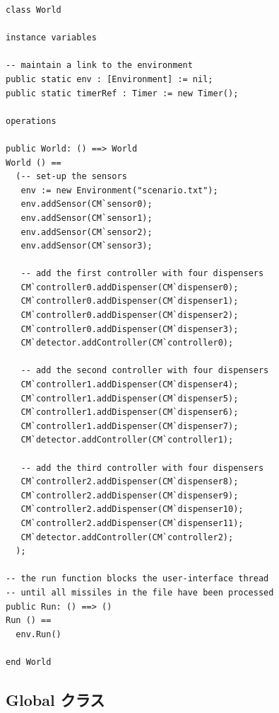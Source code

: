 \documentclass[\pformat,12pt]{jreport}
\begin{document}
\begin{lstlisting}
class World

instance variables
  
-- maintain a link to the environment
public static env : [Environment] := nil;
public static timerRef : Timer := new Timer();

operations

public World: () ==> World
World () ==
  (-- set-up the sensors
   env := new Environment("scenario.txt");
   env.addSensor(CM`sensor0);
   env.addSensor(CM`sensor1);
   env.addSensor(CM`sensor2);
   env.addSensor(CM`sensor3);

   -- add the first controller with four dispensers
   CM`controller0.addDispenser(CM`dispenser0);
   CM`controller0.addDispenser(CM`dispenser1);
   CM`controller0.addDispenser(CM`dispenser2);
   CM`controller0.addDispenser(CM`dispenser3);
   CM`detector.addController(CM`controller0);

   -- add the second controller with four dispensers
   CM`controller1.addDispenser(CM`dispenser4);
   CM`controller1.addDispenser(CM`dispenser5);
   CM`controller1.addDispenser(CM`dispenser6);
   CM`controller1.addDispenser(CM`dispenser7);
   CM`detector.addController(CM`controller1);
 
   -- add the third controller with four dispensers
   CM`controller2.addDispenser(CM`dispenser8);
   CM`controller2.addDispenser(CM`dispenser9);
   CM`controller2.addDispenser(CM`dispenser10);
   CM`controller2.addDispenser(CM`dispenser11);
   CM`detector.addController(CM`controller2);
  );

-- the run function blocks the user-interface thread
-- until all missiles in the file have been processed
public Run: () ==> ()
Run () == 
  env.Run()

end World
\end{lstlisting}

\subsection{Global クラス}
\end{document}
